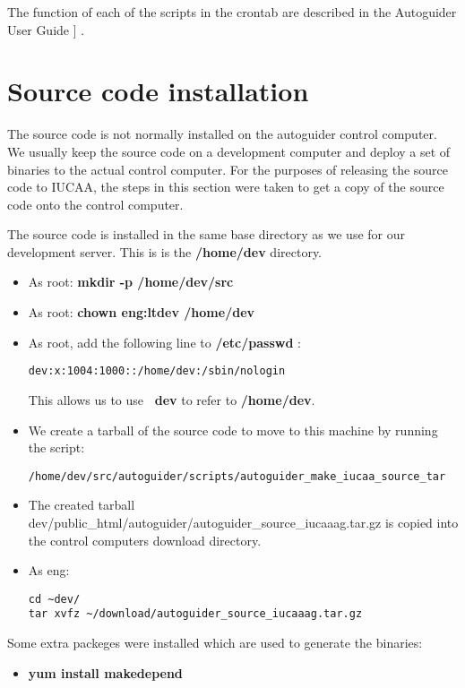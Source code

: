 \documentclass[10pt,a4paper]{article}
\begin{document}
The function of each of the scripts in the crontab are described in the Autoguider User Guide ]
\cite{bib:autoguideruserguide}.

\section{Source code installation}

The source code is not normally installed on the autoguider control computer. We usually keep the source code on a development computer and deploy a set of binaries to the actual control computer. For the purposes of releasing the source code to IUCAA, the steps in this section were taken to get a copy of the source code onto the control computer.

The source code is installed in the same base directory as we use for our development server. This is is the {\bf /home/dev} directory.

\begin{itemize}
\item As root: {\bf mkdir -p /home/dev/src}
\item As root: {\bf chown eng:ltdev /home/dev}
\item As root, add the following line to {\bf /etc/passwd} : 
\begin{verbatim}
dev:x:1004:1000::/home/dev:/sbin/nologin
\end{verbatim}
This allows us to use {\bf ~dev} to refer to {\bf /home/dev}.
\item We create a tarball of the source code to move to this machine by running the script:
\begin{verbatim}
/home/dev/src/autoguider/scripts/autoguider_make_iucaa_source_tar
\end{verbatim}
\item The created tarball \mytilde dev/public\_html/autoguider/autoguider\_source\_iucaaag.tar.gz is copied into the control computers download directory.
\item As eng:
\begin{verbatim}
cd ~dev/
tar xvfz ~/download/autoguider_source_iucaaag.tar.gz
\end{verbatim}
\end{itemize}

Some extra packeges were installed which are used to generate the binaries:

\begin{itemize}
\item {\bf yum install makedepend}
\end{itemize}
\end{document}
